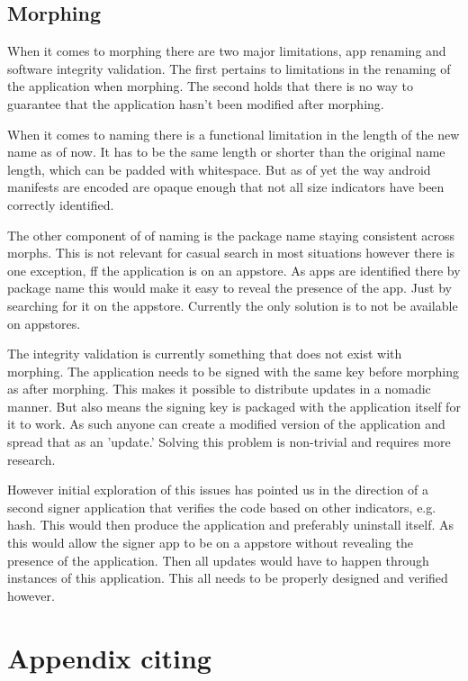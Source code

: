 \documentclass[twocolumn,english,compsoc,journal]{IEEEtran}
\begin{document}
\subsection{Morphing}

When it comes to morphing there are two major limitations, app renaming
and software integrity validation. The first pertains to limitations in the renaming
of the application when morphing. The second holds that there is no way
to guarantee that the application hasn't been modified after morphing.

When it comes to naming there is a functional limitation in the length
of the new name as of now.
It has to be the same length or shorter than the original name length,
which can be padded with whitespace. But as of yet the way android
manifests are encoded are opaque enough that not all size indicators
have been correctly identified.

The other component of of naming is the package name staying consistent
across morphs. This is not relevant for casual search in most situations
however there is one exception, ff the application is on an appstore. As
apps are identified there by package name this would make it easy to
reveal the presence of the app. Just by searching for it on the appstore.
Currently the only solution is to not be available on appstores.

The integrity validation is currently something that does not exist with
morphing. The application needs to be signed with the same key
before morphing as after morphing. This makes it possible to distribute
updates in a nomadic manner. But also means the signing key is packaged
with the application itself for it to work. As such anyone can create a
modified version of the application and spread that as an 'update.'
Solving this problem is non-trivial and requires more research.

However initial exploration of this issues has pointed us in the direction
of a second signer application that verifies the code based on other
indicators, e.g. hash. This would then produce the application and
preferably uninstall itself. As this would allow the signer app to be
on a appstore without revealing the presence of the application. Then 
all updates would have to happen through instances of this application.
This all needs to be properly designed and verified however.


\appendices{}


\section{Appendix citing}
\end{document}
